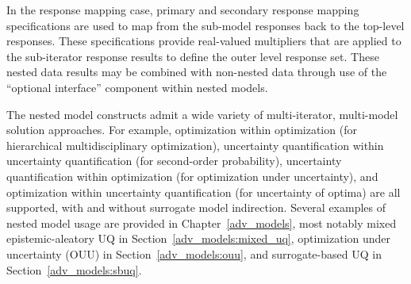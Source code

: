 In the response mapping case, primary and secondary response
mapping specifications are used to map from the sub-model responses
back to the top-level responses.  These specifications provide
real-valued multipliers that are applied to the sub-iterator response
results to define the outer level response set.  These nested data
results may be combined with non-nested data through use of the 
``optional interface'' component within nested models.

The nested model constructs admit a wide variety of multi-iterator,
multi-model solution approaches.  For example, optimization within
optimization (for hierarchical multidisciplinary optimization),
uncertainty quantification within uncertainty quantification (for
second-order probability), uncertainty quantification within
optimization (for optimization under uncertainty), and optimization
within uncertainty quantification (for uncertainty of optima) are all
supported, with and without surrogate model indirection.  Several
examples of nested model usage are provided in
Chapter~\ref{adv_models}, most notably mixed epistemic-aleatory UQ in
Section~\ref{adv_models:mixed_uq}, optimization under uncertainty
(OUU) in Section~\ref{adv_models:ouu}, and surrogate-based UQ in
Section~\ref{adv_models:sbuq}.
